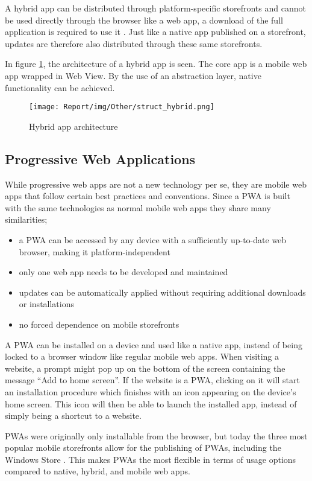 \documentclass[a4paper,12pt]{article}
\begin{document}
A hybrid app can be distributed through platform-specific storefronts and cannot be used directly through the browser like a web app, a download of the full application is required to use it \cite{crossplatform_2012, mobile_web_apps_2013}. Just like a native app published on a storefront, updates are therefore also distributed through these same storefronts.

In figure \ref{fig:hybridapp}, the architecture of a hybrid app is seen. The core app is a mobile web app wrapped in Web View. By the use of an abstraction layer, native functionality can be achieved.

\begin{figure}[h]%
	\centering
	\texttt{[image: Report/img/Other/struct\_hybrid.png]}
	\caption{Hybrid app architecture}%
	\label{fig:hybridapp}%
\end{figure}

\subsection{Progressive Web Applications}
While progressive web apps are not a new technology per se, they are mobile web apps that follow certain best practices and conventions. Since a PWA is built with the same technologies as normal mobile web apps they share many similarities;
\begin{itemize}
    \item a PWA can be accessed by any device with a sufficiently up-to-date web browser, making it platform-independent
    \item only one web app needs to be developed and maintained
    \item updates can be automatically applied without requiring additional downloads or installations
    \item no forced dependence on mobile storefronts
\end{itemize}

A PWA can be installed on a device and used like a native app, instead of being locked to a browser window like regular mobile web apps. When visiting a website, a prompt might pop up on the bottom of the screen containing the message “Add to home screen”. If the website is a PWA, clicking on it will start an installation procedure which finishes with an icon appearing on the device’s home screen. This icon will then be able to launch the installed app, instead of simply being a shortcut to a website. 

PWAs were originally only installable from the browser, but today the three most popular mobile storefronts allow for the publishing of PWAs, including the Windows Store \cite{how_to_publish_pwa_in_stores}. This makes PWAs the most flexible in terms of usage options compared to native, hybrid, and mobile web apps.
\end{document}
